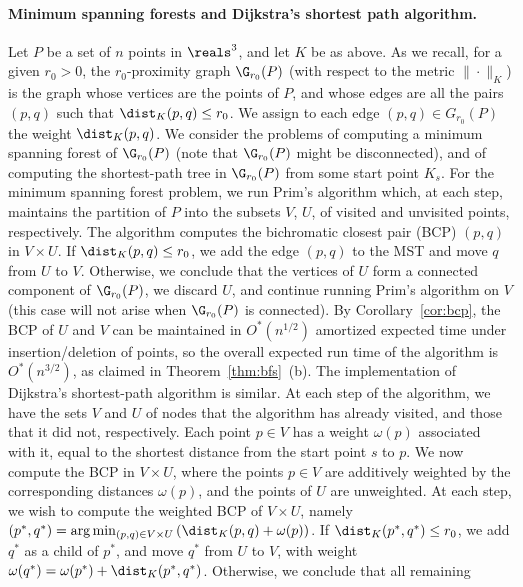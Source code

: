 \paragraph{Minimum spanning forests and Dijkstra's shortest path algorithm.}
\fi
%
Let $P$ be a set of $n$ points in $\reals^3$, and let $K$ be as above. As we recall,
for a given $r_0>0$, 
the $r_0$-proximity graph $\G_{r_0}(P)$ (with respect to the metric $\|\cdot\|_K$) 
is the graph whose vertices are the points of $P$, and whose
edges are all the pairs $(p,q)$ such that $\dist_K(p,q) \le r_0$. 
We assign to each edge $(p,q)\in G_{r_0}(P)$ the weight $\dist_K(p,q)$. We consider the problems 
of computing a minimum spanning forest of $\G_{r_0}(P)$ (note that $\G_{r_0}(P)$ might be disconnected), 
and of computing the shortest-path tree in $\G_{r_0}(P)$ from some start point $K_s$.
%
For the minimum spanning forest problem, 
we run Prim's algorithm which, at each step, maintains the partition of $P$
into the subsets $V$, $U$, of visited and unvisited points, respectively. The algorithm computes
the bichromatic closest pair (BCP) $(p,q)$ in $V\times U$. If $\dist_K(p,q) \le r_0$, 
we add the edge $(p,q)$ to the MST and move $q$ from $U$ to $V$. Otherwise, we
conclude that the vertices of $U$ form a connected component of $\G_{r_0} (P)$, we discard $U$, 
and continue running Prim's algorithm on $V$ (this case will not arise when $\G_{r_0}(P)$ 
is connected). By Corollary~\ref{cor:bcp}, the BCP of $U$ and $V$ can be maintained in $O^*(n^{1/2})$ 
amortized expected time under insertion/deletion of points, so the overall expected run time 
of the algorithm is $O^*(n^{3/2})$, as claimed in Theorem~\ref{thm:bfs}~(b).
%
%
The implementation of Dijkstra's shortest-path algorithm is similar.
At each step of the algorithm, we have the sets $V$ and $U$ of nodes that the algorithm has already visited, and
those that it did not, respectively. Each point $p\in V$ has a weight $\omega(p)$ associated with it, equal to
the shortest distance from the start point $s$ to $p$. We now compute the BCP in $V\times U$, where the
points $p\in V$ are additively weighted by the corresponding distances $\omega(p)$, and the points
of $U$ are unweighted. At each step, we wish to compute the weighted BCP of $V \times U$,
namely $(p^*,q^*) = \arg\min_{(p,q)\in V\times U} \left( \dist_K(p,q)+\omega(p) \right)$. 
If $\dist_K(p^*,q^*) \le r_0$, 
we add $q^*$ as a child of $p^*$, and move $q^*$ from $U$ to $V$, with weight
$\omega(q^*) = \omega(p^*) + \dist_K(p^*,q^*)$. Otherwise, we conclude that all remaining 
